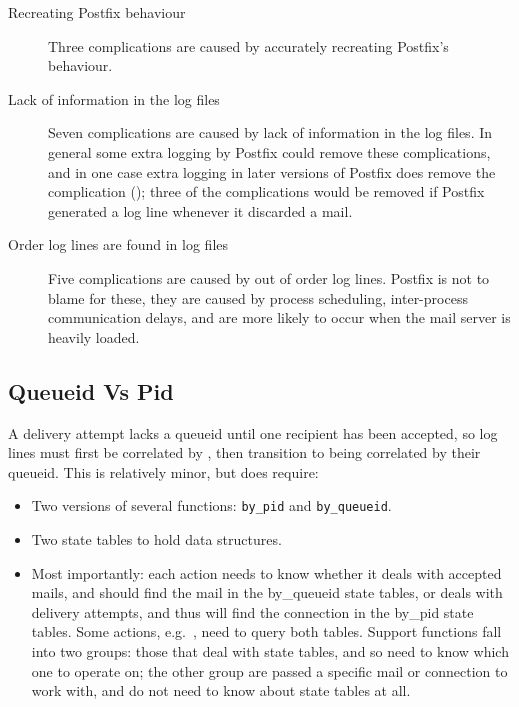 \begin{description}

    \item [Recreating Postfix behaviour] Three complications are caused by
        \parsername{} accurately recreating Postfix's behaviour.

    \item [Lack of information in the log files] Seven complications are
        caused by lack of information in the log files.  In general some
        extra logging by Postfix could remove these complications, and in
        one case extra logging in later versions of Postfix does remove the
        complication (); three
        of the complications would be removed if Postfix generated a log
        line whenever it discarded a mail.

    \item [Order log lines are found in log files] Five complications are
        caused by out of order log lines.  Postfix is not to blame for
        these, they are caused by process scheduling, inter-process
        communication delays, and are more likely to occur when the mail
        server is heavily loaded.

\end{description}

\subsection{Queueid Vs Pid}

\label{queueid vs pid}

A delivery attempt lacks a queueid until one recipient has been accepted,
so log lines must first be correlated by  , then
transition to being correlated by their queueid.  This is relatively minor,
but does require:

\begin{itemize}

    \item Two versions of several functions: \texttt{by\_pid} and
        \texttt{by\_queueid}.

    \item Two state tables to hold data structures.

    \item Most importantly: each action needs to know whether it deals with
        accepted mails, and should find the mail in the by\_queueid state
        tables, or deals with delivery attempts, and thus will find the
        connection in the by\_pid state tables.  Some actions, e.g.\
        , need to query both tables.  Support
        functions fall into two groups: those that deal with state tables,
        and so need to know which one to operate on; the other group are
        passed a specific mail or connection to work with, and do not need
        to know about state tables at all.

\end{itemize}

